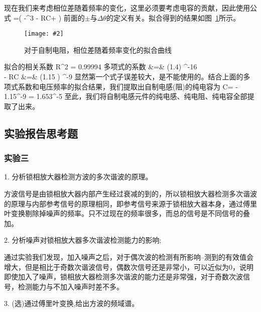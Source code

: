 \documentclass[11pt,a4paper]{ctexart}
\newcommand{\cpic}[2]{
\begin{center}
\texttt{[image: \#2]}
\end{center}
}
\newcommand{\cpicn}[3]
{
\begin{figure}[H]
\cpic{#1}{#2}
\caption{\color{red}#3\label{#2}}
\end{figure}
}
\begin{document}
 现在我们来考虑相位差随着频率的变化，这里必须要考虑电容的贡献，因此使用公式
 \beq
\tan\Delta\theta =\pm\left( -\omega^3 - RC\omega + \right)
\eeq
前面的$\pm$与$\Delta \theta$的定义有关。拟合得到的结果如图~\ref{theta-freq-inductance.jpg}所示。
\cpicn{0.5}{theta-freq-inductance.jpg}{对于自制电阻，相位差随着频率变化的拟合曲线}
拟合的相关系数
\beq
R^2 = 0.99994
\eeq
多项式的系数
\bea
{} &=& (1.4) ^{-16}  \\
 - RC &=& (1.15 ) ^{-9} 
\eea
显然第一个式子误差较大，是不能使用的。结合上面的多项式系数和电压频率的拟合结果，我们提取出自制电感(阻)的纯电容为
\beq
C= - 1.15^{-9} = 1.653^{-5}  
\eeq
至此，我们将自制电感元件的纯电感、纯电阻、纯电容全部提取了出来。


\subsection{实验报告思考题}
\subsubsection{实验三}
1. 分析锁相放大器检测方波的多次谐波的原理。

方波信号是由锁相放大器内部产生经过衰减的到的，所以锁相放大器检测多次谐波的原理与内部参考信号的原理相同，即参考信号来源于锁相放大器本身，通过傅里叶变换剔除掉噪声的频率。只不过现在的频率很多，而总的信号是不同信号的叠加。

2. 分析噪声对锁相放大器多次谐波检测能力的影响;

通过实验我们发现，加入噪声之后，对于偶次波的检测有所影响--测到的有效值会增大，但是相比于奇数次谐波信号，偶数次信号还是非常小，可以近似为0，说明即使加入了噪声，锁相放大器检测多次谐波的能力还是非常强，对于奇数次波信号，检测能力与不加入噪声时差不多。

3. (选)通过傅里叶变换,给出方波的频域谱。
\end{document}
